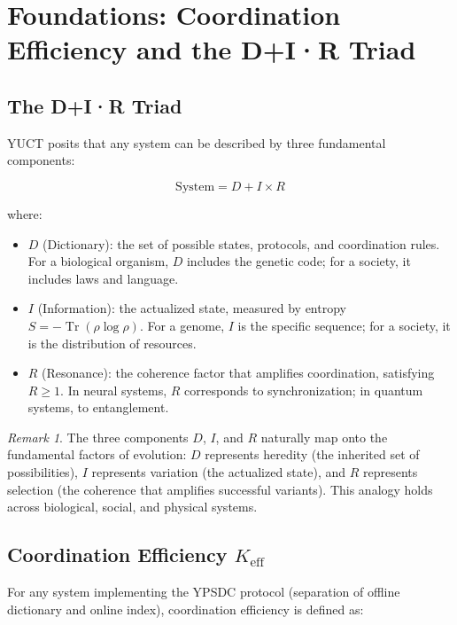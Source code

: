 \documentclass[12pt,a4paper]{article}
\theoremstyle{remark}
\newtheorem{remark}[theorem]{Remark}
\newcommand{\Keff}{K_{\mathrm{eff}}}
\DeclareMathOperator{\Tr}{Tr}
\begin{document}
	\section{Foundations: Coordination Efficiency and the D+I·R Triad}
	\label{sec:foundations}
	
	\subsection{The D+I·R Triad}
	
	YUCT posits that any system can be described by three fundamental components:
	
	\begin{equation}
		\text{System} = D + I \times R
		\label{eq:triad}
	\end{equation}
	
	where:
	\begin{itemize}
		\item $D$ (Dictionary): the set of possible states, protocols, and coordination rules. For a biological organism, $D$ includes the genetic code; for a society, it includes laws and language.
		\item $I$ (Information): the actualized state, measured by entropy $S = -\Tr(\rho \log \rho)$. For a genome, $I$ is the specific sequence; for a society, it is the distribution of resources.
		\item $R$ (Resonance): the coherence factor that amplifies coordination, satisfying $R \geq 1$. In neural systems, $R$ corresponds to synchronization; in quantum systems, to entanglement.
	\end{itemize}
	
	\begin{remark}
		The three components $D$, $I$, and $R$ naturally map onto the fundamental factors of evolution: $D$ represents heredity (the inherited set of possibilities), $I$ represents variation (the actualized state), and $R$ represents selection (the coherence that amplifies successful variants). This analogy holds across biological, social, and physical systems.
	\end{remark}
	
	\subsection{Coordination Efficiency $\Keff$}
	
	For any system implementing the YPSDC protocol (separation of offline dictionary and online index), coordination efficiency is defined as:
	
\end{document}
